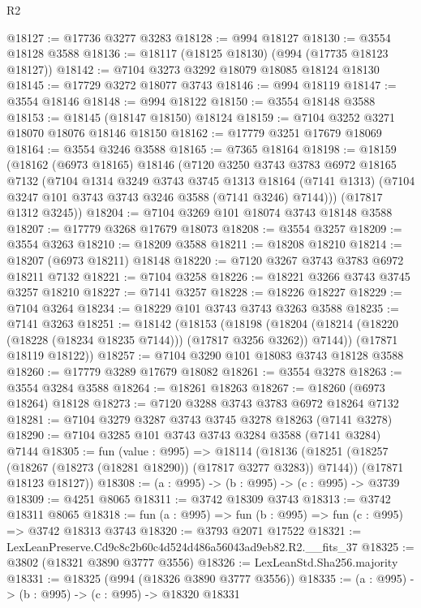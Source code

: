 \begin{lexlean}{R2}
\begin{coremodule}
@18127 := @17736 @3277 @3283
@18128 := @994 @18127
@18130 := @3554 @18128 @3588
@18136 := @18117 (@18125 @18130) (@994 (@17735 @18123 @18127))
@18142 := @7104 @3273 @3292 @18079 @18085 @18124 @18130
@18145 := @17729 @3272 @18077 @3743
@18146 := @994 @18119
@18147 := @3554 @18146
@18148 := @994 @18122
@18150 := @3554 @18148 @3588
@18153 := @18145 (@18147 @18150) @18124
@18159 := @7104 @3252 @3271 @18070 @18076 @18146 @18150
@18162 := @17779 @3251 @17679 @18069
@18164 := @3554 @3246 @3588
@18165 := @7365 @18164
@18198 := @18159
    (@18162
      (@6973 @18165)
      @18146
      (@7120
        @3250
        @3743
        @3783
        @6972
        @18165
        @7132
        (@7104
          @1314
          @3249
          @3743
          @3745
          @1313
          @18164
          (@7141 @1313)
          (@7104 @3247 @101 @3743 @3743 @3246 @3588 (@7141 @3246) @7144)))
      (@17817 @1312 @3245))
@18204 := @7104 @3269 @101 @18074 @3743 @18148 @3588
@18207 := @17779 @3268 @17679 @18073
@18208 := @3554 @3257
@18209 := @3554 @3263
@18210 := @18209 @3588
@18211 := @18208 @18210
@18214 := @18207 (@6973 @18211) @18148
@18220 := @7120 @3267 @3743 @3783 @6972 @18211 @7132
@18221 := @7104 @3258
@18226 := @18221 @3266 @3743 @3745 @3257 @18210
@18227 := @7141 @3257
@18228 := @18226 @18227
@18229 := @7104 @3264
@18234 := @18229 @101 @3743 @3743 @3263 @3588
@18235 := @7141 @3263
@18251 := @18142
    (@18153
      (@18198 (@18204 (@18214 (@18220 (@18228 (@18234 @18235 @7144))) (@17817 @3256 @3262)) @7144))
      (@17871 @18119 @18122))
@18257 := @7104 @3290 @101 @18083 @3743 @18128 @3588
@18260 := @17779 @3289 @17679 @18082
@18261 := @3554 @3278
@18263 := @3554 @3284 @3588
@18264 := @18261 @18263
@18267 := @18260 (@6973 @18264) @18128
@18273 := @7120 @3288 @3743 @3783 @6972 @18264 @7132
@18281 := @7104 @3279 @3287 @3743 @3745 @3278 @18263 (@7141 @3278)
@18290 := @7104 @3285 @101 @3743 @3743 @3284 @3588 (@7141 @3284) @7144
@18305 := fun (value : @995) =>
  @18114
    (@18136
      (@18251 (@18257 (@18267 (@18273 (@18281 @18290)) (@17817 @3277 @3283)) @7144))
      (@17871 @18123 @18127))
@18308 := (a : @995) -> (b : @995) -> (c : @995) -> @3739
@18309 := @4251 @8065
@18311 := @3742 @18309 @3743
@18313 := @3742 @18311 @8065
@18318 := fun (a : @995) => fun (b : @995) => fun (c : @995) => @3742 @18313 @3743
@18320 := @3793 @2071 @17522
@18321 := LexLeanPreserve.Cd9c8c2b60c4d524d486a56043ad9eb82.R2.__fits_37
@18325 := @3802 (@18321 @3890 @3777 @3556)
@18326 := LexLeanStd.Sha256.majority
@18331 := @18325 (@994 (@18326 @3890 @3777 @3556))
@18335 := (a : @995) -> (b : @995) -> (c : @995) -> @18320 @18331

\end{coremodule}
\end{lexlean}
